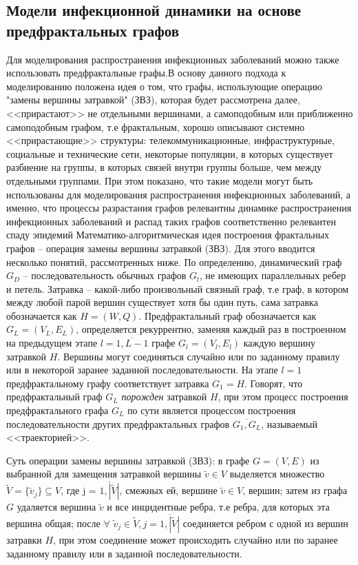 \subsection{Модели инфекционной динамики на основе предфрактальных графов}

Для моделирования распространения инфекционных заболеваний можно также использовать предфрактальные графы.В основу данного подхода к моделированию положена идея о том, что графы, использующие операцию "замены вершины затравкой" (ЗВЗ), которая будет рассмотрена далее, <<прирастают>> не отдельными вершинами, а самоподобным или приближенно самоподобным  графом, т.е фрактальным, хорошо описывают   системно <<прирастающие>> структуры: телекоммуникационные, инфраструктурные, социальные и технические сети, некоторые популяции, в которых существует разбиение на группы, в которых связей внутри группы больше, чем между отдельными группами. При этом показано,  что такие модели могут быть использованы для моделирования распространения инфекционных заболеваний, а именно, что процессы разрастания  графов релевантны динамике распространения инфекционных  заболеваний  и распад таких графов соответственно релевантен  спаду эпидемий %
\cite{Utakaeva_disser:2011}
Математико-алгоритмическая  идея построения фрактальных графов -- операция замены вершины затравкой (ЗВЗ). Для этого вводится несколько понятий, рассмотренных ниже.
По определению, динамический граф ${G_D}$ -- последовательность обычных графов $G_l$, не имеющих параллельных ребер и петель. Затравка -- какой-либо произвольный связный граф, т.е граф, в котором между любой парой вершин существует хотя бы один путь, сама затравка обозначается как  ${H=(W,Q)}$. Предфрактальный граф обозначается как $G_L=(V_L,E_L)$, определяется рекуррентно, заменяя каждый раз в построенном на предыдущем этапе $l = \overline{1, L-1}$ графе $G_l=(V_l,E_l)$ каждую вершину затравкой $H$. Вершины могут соединяться случайно или по заданному правилу или в некоторой заранее заданной последовательности. На этапе $l=1$ предфрактальному графу соответствует затравка $G_1=H$. Говорят, что предфрактальный граф $G_L$  \textit{порожден} затравкой $H$, при этом процесс построения предфрактального графа $G_L$  по сути является процессом построения последовательности других предфрактальных графов $\overline{G_1,G_L}$, называемый <<траекторией>>. 

Суть операции замены вершины затравкой (ЗВЗ): в графе $G=(V, E)$ из выбранной для замещения затравкой вершины $\tilde{v}  \in V $ выделяется множество $\tilde{V} = \{\tilde{v}_j\} \subseteq V$, где j = $\overline{1,|\tilde{V}|}$, смежных ей, вершине $\tilde{v}  \in V $, вершин; затем из графа $G$ удаляется вершина $\tilde{v}$ и все инцидентные ребра, т.е ребра, для которых эта вершина общая; после $\forall$ $\tilde{v}_j \in \tilde{V}, j=\overline{1,|\tilde{V}|}$ соединяется ребром с одной из вершин затравки $H$, при этом соединение может происходить случайно или по заранее заданному правилу или в заданной последовательности.

